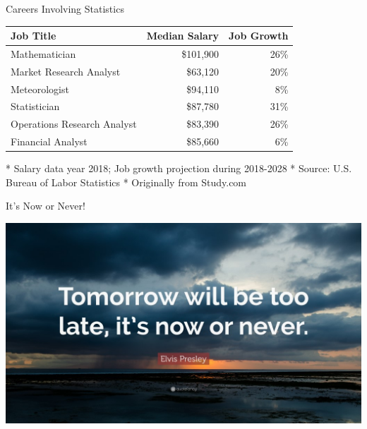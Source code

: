 \documentclass{beamer}
\begin{document}
\begin{frame}{Careers Involving Statistics}



\begin{center}
\begin{tabular}{l|r|r}
\hline 
Job Title & Median Salary& Job Growth  \\ 
\hline 
Mathematician & \$101,900 & 26\% \\ 
\hline 
Market Research Analyst & \$63,120 & 20\% \\ 
\hline 
Meteorologist & \$94,110 & 8\% \\ 
\hline 
Statistician & \$87,780 & 31\% \\ 
\hline 
Operations Research Analyst & \$83,390 & 26\% \\ 
\hline 
Financial Analyst & \$85,660 & 6\% \\ 
\hline 
\end{tabular} 
\end{center}

\begin{scriptsize}
* Salary data year 2018; Job growth projection during 2018-2028\linebreak
* Source: U.S. Bureau of Labor Statistics \linebreak
* Originally from Study.com
\end{scriptsize}

\end{frame}


\begin{frame}{It's Now or Never!}

\begin{center}
\includegraphics[scale=0.30]{images/nowOrNever.jpg}
\end{center}

\end{frame}
\end{document}
